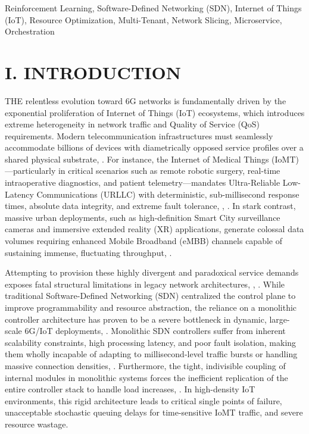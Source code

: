\documentclass[conference]{IEEEtran}
\begin{document}
\begin{IEEEkeywords}
Reinforcement Learning, Software-Defined Networking (SDN), Internet of Things (IoT), Resource Optimization, Multi-Tenant, Network Slicing, Microservice, Orchestration
\end{IEEEkeywords}

\section{I. INTRODUCTION}\label{i.-introduction}

\textsc{T}\textsc{HE} relentless evolution toward 6G networks is fundamentally driven by the exponential proliferation of Internet of Things (IoT) ecosystems, which introduces extreme heterogeneity in network traffic and Quality of Service (QoS) requirements\cite{b1}. Modern telecommunication infrastructures must seamlessly accommodate billions of devices with diametrically opposed service profiles over a shared physical substrate\cite{b2}, \cite{b3}. For instance, the Internet of Medical Things (IoMT)---particularly in critical scenarios such as remote robotic surgery, real-time intraoperative diagnostics, and patient telemetry---mandates Ultra-Reliable Low-Latency Communications (URLLC) with deterministic, sub-millisecond response times, absolute data integrity, and extreme fault tolerance\cite{b1}, \cite{b4}, \cite{b5}. In stark contrast, massive urban deployments, such as high-definition Smart City surveillance cameras and immersive extended reality (XR) applications, generate colossal data volumes requiring enhanced Mobile Broadband (eMBB) channels capable of sustaining immense, fluctuating throughput\cite{b4}, \cite{b6}.

Attempting to provision these highly divergent and paradoxical service demands exposes fatal structural limitations in legacy network architectures\cite{b1}, \cite{b7}, \cite{b8}. While traditional Software-Defined Networking (SDN) centralized the control plane to improve programmability and resource abstraction, the reliance on a monolithic controller architecture has proven to be a severe bottleneck in dynamic, large-scale 6G/IoT deployments\cite{b8}, \cite{b9}. Monolithic SDN controllers suffer from inherent scalability constraints, high processing latency, and poor fault isolation, making them wholly incapable of adapting to millisecond-level traffic bursts or handling massive connection densities\cite{b8}, \cite{b9}. Furthermore, the tight, indivisible coupling of internal modules in monolithic systems forces the inefficient replication of the entire controller stack to handle load increases\cite{b8}, \cite{b9}. In high-density IoT environments, this rigid architecture leads to critical single points of failure, unacceptable stochastic queuing delays for time-sensitive IoMT traffic, and severe resource wastage\cite{b9}.
\end{document}
